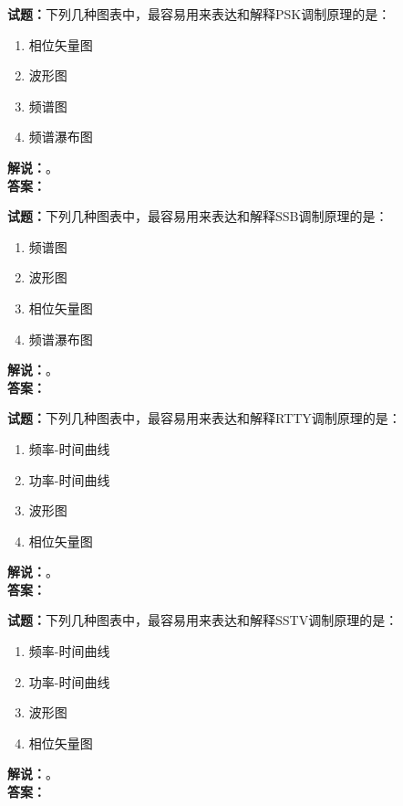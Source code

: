 \documentclass{ctexbook}
\begin{document}
\vspace{\baselineskip}

\noindent\textbf{试题：}下列几种图表中，最容易用来表达和解释PSK调制原理的是：
\begin{enumerate}[leftmargin=3em]
  \item 相位矢量图
  \item 波形图
  \item 频谱图
  \item 频谱瀑布图
\end{enumerate}
\noindent\textbf{解说：}\textbf{}。\\\noindent\textbf{答案：}

\vspace{\baselineskip}

\noindent\textbf{试题：}下列几种图表中，最容易用来表达和解释SSB调制原理的是：
\begin{enumerate}[leftmargin=3em]
  \item 频谱图
  \item 波形图
  \item 相位矢量图
  \item 频谱瀑布图
\end{enumerate}
\noindent\textbf{解说：}\textbf{}。\\\noindent\textbf{答案：}

\vspace{\baselineskip}

\noindent\textbf{试题：}下列几种图表中，最容易用来表达和解释RTTY调制原理的是：
\begin{enumerate}[leftmargin=3em]
  \item 频率-时间曲线
  \item 功率-时间曲线
  \item 波形图
  \item 相位矢量图
\end{enumerate}
\noindent\textbf{解说：}\textbf{}。\\\noindent\textbf{答案：}

\vspace{\baselineskip}

\noindent\textbf{试题：}下列几种图表中，最容易用来表达和解释SSTV调制原理的是：
\begin{enumerate}[leftmargin=3em]
  \item 频率-时间曲线
  \item 功率-时间曲线
  \item 波形图
  \item 相位矢量图
\end{enumerate}
\noindent\textbf{解说：}\textbf{}。\\\noindent\textbf{答案：}
\end{document}
